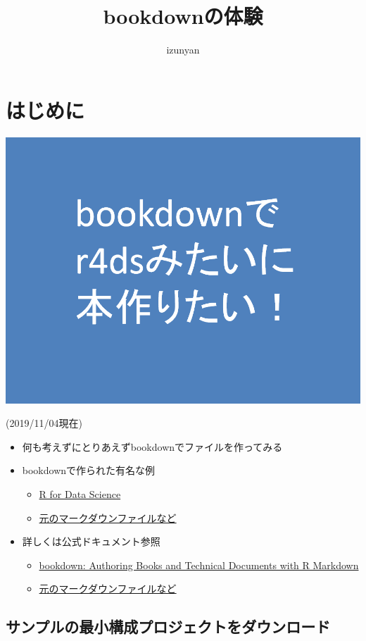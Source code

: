 \documentclass[xelatex,ja=standard]{bxjsbook}
\title{bookdownの体験}
\author{izunyan}
\date{}
\providecommand{\tightlist}{%
  \setlength{\itemsep}{0pt}\setlength{\parskip}{0pt}}
\begin{document}
\maketitle

{
\setcounter{tocdepth}{2}
\tableofcontents
}
\hypertarget{hajime}{%
\section*{はじめに}\label{hajime}}

\includegraphics[width=0.6\linewidth]{images/cover}

(2019/11/04現在)

\begin{itemize}
\item
  何も考えずにとりあえずbookdownでファイルを作ってみる
\item
  bookdownで作られた有名な例

  \begin{itemize}
  \tightlist
  \item
    \href{https://r4ds.had.co.nz/}{R for Data Science}
  \item
    \href{https://github.com/hadley/r4ds}{元のマークダウンファイルなど}
  \end{itemize}
\item
  詳しくは公式ドキュメント参照

  \begin{itemize}
  \tightlist
  \item
    \href{https://bookdown.org/yihui/bookdown/}{bookdown: Authoring Books and Technical Documents with R Markdown}
  \item
    \href{https://github.com/rstudio/bookdown/tree/master/inst/examples}{元のマークダウンファイルなど}
  \end{itemize}
\end{itemize}

\hypertarget{hajime_dl}{%
\subsection*{サンプルの最小構成プロジェクトをダウンロード}\label{hajime_dl}}
\end{document}
